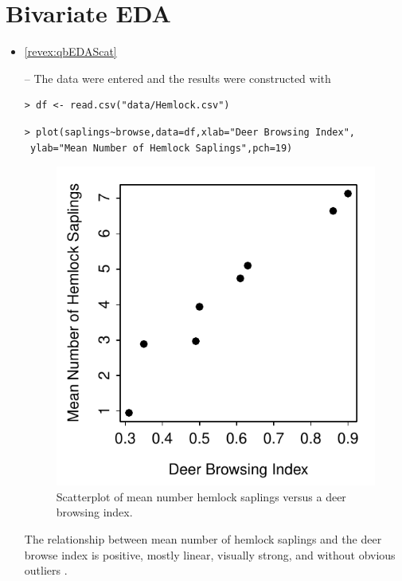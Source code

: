 \documentclass[10pt,openany]{book}\usepackage[]{graphicx}\usepackage[]{color}
\makeatletter
\newenvironment{kframe}{%
 \def\at@end@of@kframe{}%
 \ifinner\ifhmode%
  \def\at@end@of@kframe{\end{minipage}}%
  \begin{minipage}{\columnwidth}%
 \fi\fi%
 \def\FrameCommand##1{\hskip\@totalleftmargin \hskip-\fboxsep
 \colorbox{shadecolor}{##1}\hskip-\fboxsep
     \hskip-\linewidth \hskip-\@totalleftmargin \hskip\columnwidth}%
 \MakeFramed {\advance\hsize-\width
   \@totalleftmargin\z@ \linewidth\hsize
   \@setminipage}}%
 {\par\unskip\endMakeFramed%
 \at@end@of@kframe}
\newenvironment{knitrout}{}{} %
\makeatother
\begin{document}
\section*{Bivariate EDA}
\begin{itemize}
  \item \hypertarget{ans:qbEDAScat}{\ref{revex:qbEDAScat}} --   The data were entered and the results were constructed with

\begin{knitrout}
\color{fgcolor}\begin{kframe}
\begin{verbatim}
> df <- read.csv("data/Hemlock.csv")
\end{verbatim}
\end{kframe}
\end{knitrout}
\begin{knitrout}
\color{fgcolor}\begin{kframe}
\begin{verbatim}
> plot(saplings~browse,data=df,xlab="Deer Browsing Index",
 ylab="Mean Number of Hemlock Saplings",pch=19)
\end{verbatim}
\end{kframe}\begin{figure}[hbtp]

{\centering \includegraphics[width=.4\linewidth]{Figs/HemDeerPlot-1} 

}

\caption[Scatterplot of mean number hemlock saplings versus a deer browsing index]{Scatterplot of mean number hemlock saplings versus a deer browsing index.}\label{fig:HemDeerPlot}
\end{figure}


\end{knitrout}
The relationship between mean number of hemlock saplings and the deer browse index is positive, mostly linear, visually strong, and without obvious outliers .


\end{itemize}
\end{document}
